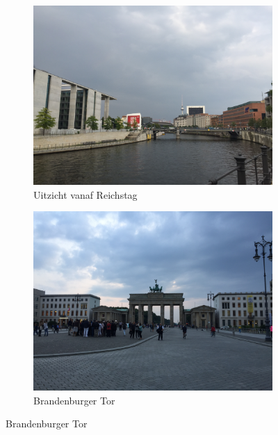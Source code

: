 \begin{figure}[!h]
\begin{subfigure}[h]{0.48\textwidth}
    \includegraphics[width=\linewidth]{images/berlijn/uitzicht_reichstag.jpg}
    \caption{Uitzicht vanaf Reichstag}
  \end{subfigure}
  \begin{subfigure}[h]{0.48\textwidth}
    \includegraphics[width=\linewidth]{images/berlijn/brandenburger_tor.jpg}
    \caption{Brandenburger Tor}
  \end{subfigure}
\end{figure}